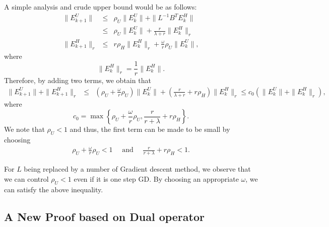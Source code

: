 \begin{itemize}
A simple analysis and crude upper bound would be as follows: 
\begin{eqnarray*}
\|E_{k+1}^U\| &\leq& \rho_U \|E_k^U\| + \|L^{-1} B^T E_k^H\| \\ 
&\leq&  \rho_U \|E_k^U\| + \frac{r}{\lambda + r} \|E_k^H\|_r \\
\|E_{k+1}^H\|_r &\leq& r \rho_H \|E_k^H\|_r + \frac{\omega}{r} \rho_U \|E_k^U\|,  
\end{eqnarray*}
where 
\begin{equation}
\|E_k^H\|_r = \frac{1}{r}\|E_k^H\|.   
\end{equation}
Therefore, by adding two terms, we obtain that 
\begin{eqnarray*}
\|E_{k+1}^U\| + \|E_{k+1}^H\|_r &\leq& \left ( \rho_U + \frac{\omega}{r} \rho_U \right) \|E_k^U\| + \left ( \frac{r}{\lambda + r} + r \rho_H \right ) \|E_k^H\|_r \leq c_0 \left ( \|E_{k}^U\| + \|E_{k}^H\|_r \right ),  
\end{eqnarray*}
where 
\begin{equation}
c_0 = \max \left \{ \rho_U + \frac{\omega}{r} \rho_U, \frac{r}{r+\lambda} + r\rho_H \right \}. 
\end{equation} 
We note that $\rho_U < 1$ and thus, the first term can be made to be small by choosing 
\begin{eqnarray}
\rho_U + \frac{\omega}{r} \rho_U < 1 \quad \mbox{ and } \quad \frac{r}{r+\lambda} + r\rho_H < 1. 
\end{eqnarray}
\begin{remark}
For $L$ being replaced by a number of Gradient descent method, we observe that we can control $\rho_U < 1$ even if it is one step GD. By choosing an appropriate $\omega$, we can satisfy the above inequality. 
\end{remark}

 
\subsection{A New Proof based on Dual operator}


\end{itemize}
